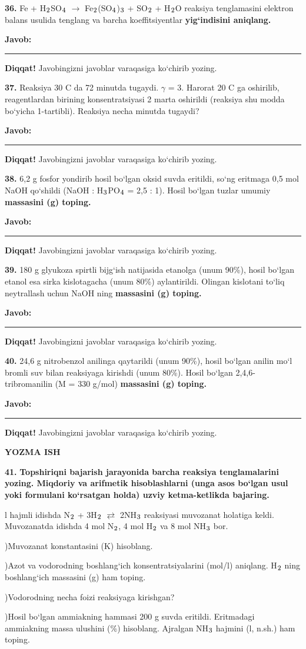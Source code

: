 \documentclass[11pt,a4paper]{article}
\renewcommand{\textsubscript}[1]{\ensuremath{_{\text{\fontsize{8}{8}\selectfont #1}}}}
\newcommand{\javob}{\par\smallskip\noindent\textbf{Javob:} \rule[-2pt]{7.5cm}{0.4pt}\par\smallskip\noindent\textbf{Diqqat!} Javobingizni javoblar varaqasiga ko`chirib yozing.\par\medskip}
\begin{document}
\par\bigskip
\noindent\textbf{36.} Fe + H\textsubscript{2}SO\textsubscript{4} $\to$ Fe\textsubscript{2}(SO\textsubscript{4})\textsubscript{3} + SO\textsubscript{2} + H\textsubscript{2}O reaksiya tenglamasini elektron balans usulida tenglang va barcha koeffitsiyentlar \textbf{yig`indisini aniqlang.}
\javob
\noindent\textbf{37.} Reaksiya 30 \textdegree{}C da 72 minutda tugaydi. $\gamma$ = 3. Harorat 20 \textdegree{}C ga oshirilib, reagentlardan birining konsentratsiyasi 2 marta oshirildi (reaksiya shu modda bo`yicha 1-tartibli). Reaksiya necha minutda tugaydi?
\javob
\noindent\textbf{38.} 6,2 g fosfor yondirib hosil bo`lgan oksid suvda eritildi, so`ng eritmaga 0,5 mol NaOH qo`shildi (NaOH : H\textsubscript{3}PO\textsubscript{4} = 2,5 : 1). Hosil bo`lgan tuzlar umumiy \textbf{massasini (g) toping.}
\javob
\noindent\textbf{39.} 180 g glyukoza spirtli bijg`ish natijasida etanolga (unum 90\%), hosil bo`lgan etanol esa sirka kislotagacha (unum 80\%) aylantirildi. Olingan kislotani to`liq neytrallash uchun NaOH ning \textbf{massasini (g) toping.}
\javob
\noindent\textbf{40.} 24,6 g nitrobenzol anilinga qaytarildi (unum 90\%), hosil bo`lgan anilin mo`l bromli suv bilan reaksiyaga kirishdi (unum 80\%). Hosil bo`lgan 2,4,6-tribromanilin (M = 330 g/mol) \textbf{massasini (g) toping.}
\javob
\par\bigskip\begin{center}\textbf{\fontsize{13}{15}\selectfont YOZMA ISH}\end{center}
\noindent\textbf{41.} \textbf{Topshiriqni bajarish jarayonida barcha reaksiya tenglamalarini yozing. Miqdoriy va arifmetik hisoblashlarni (unga asos bo`lgan usul yoki formulani ko`rsatgan holda) uzviy ketma-ketlikda bajaring.}\par{} l hajmli idishda N\textsubscript{2} + 3H\textsubscript{2} $\rightleftarrows$ 2NH\textsubscript{3} reaksiyasi muvozanat holatiga keldi. Muvozanatda idishda 4 mol N\textsubscript{2}, 4 mol H\textsubscript{2} va 8 mol NH\textsubscript{3} bor.\par
{})Muvozanat konstantasini (K) hisoblang.\par
{})Azot va vodorodning boshlang`ich konsentratsiyalarini (mol/l) aniqlang. H\textsubscript{2} ning boshlang`ich massasini (g) ham toping.\par
{})Vodorodning necha foizi reaksiyaga kirishgan?\par
{})Hosil bo`lgan ammiakning hammasi 200 g suvda eritildi. Eritmadagi ammiakning massa ulushini (\%) hisoblang. Ajralgan NH\textsubscript{3} hajmini (l, n.sh.) ham toping.\par
\end{document}
